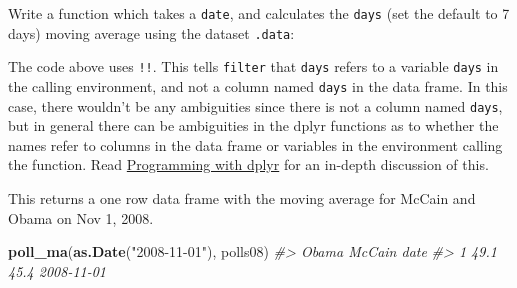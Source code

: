 \documentclass[]{book}
\newenvironment{Shaded}{\begin{snugshade}}{\end{snugshade}}
\newcommand{\KeywordTok}[1]{\textcolor[rgb]{0.13,0.29,0.53}{\textbf{#1}}}
\newcommand{\DataTypeTok}[1]{\textcolor[rgb]{0.13,0.29,0.53}{#1}}
\newcommand{\DecValTok}[1]{\textcolor[rgb]{0.00,0.00,0.81}{#1}}
\newcommand{\StringTok}[1]{\textcolor[rgb]{0.31,0.60,0.02}{#1}}
\newcommand{\CommentTok}[1]{\textcolor[rgb]{0.56,0.35,0.01}{\textit{#1}}}
\newcommand{\OtherTok}[1]{\textcolor[rgb]{0.56,0.35,0.01}{#1}}
\newcommand{\ControlFlowTok}[1]{\textcolor[rgb]{0.13,0.29,0.53}{\textbf{#1}}}
\newcommand{\OperatorTok}[1]{\textcolor[rgb]{0.81,0.36,0.00}{\textbf{#1}}}
\newcommand{\NormalTok}[1]{#1}
\theoremstyle{definition}
\theoremstyle{definition}
\theoremstyle{definition}
\theoremstyle{remark}
\begin{document}
Write a function which takes a \texttt{date}, and calculates the
\texttt{days} (set the default to 7 days) moving average using the
dataset \texttt{.data}:

\begin{Shaded}
\end{Shaded}

The code above uses \texttt{!!}. This tells \texttt{filter} that
\texttt{days} refers to a variable \texttt{days} in the calling
environment, and not a column named \texttt{days} in the data frame. In
this case, there wouldn't be any ambiguities since there is not a column
named \texttt{days}, but in general there can be ambiguities in the
dplyr functions as to whether the names refer to columns in the data
frame or variables in the environment calling the function. Read
\href{http://dplyr.tidyverse.org/articles/programming.html}{Programming
with dplyr} for an in-depth discussion of this.

This returns a one row data frame with the moving average for McCain and
Obama on Nov 1, 2008.

\begin{Shaded}
\begin{Highlighting}[]
\KeywordTok{poll_ma}\NormalTok{(}\KeywordTok{as.Date}\NormalTok{(}\StringTok{"2008-11-01"}\NormalTok{), polls08)}
\CommentTok{#>   Obama McCain       date}
\CommentTok{#> 1  49.1   45.4 2008-11-01}
\end{Highlighting}
\end{Shaded}
\end{document}
